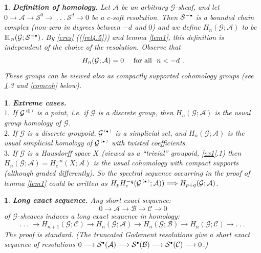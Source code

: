 \documentclass[a4paper]{article}
\newtheorem{num}[st]{}
\newcommand{\rmap}{\longrightarrow}
\newcommand{\G}{\ensuremath{\mathcal{G}}}
\newcommand{\A}{\ensuremath{\mathcal{A}}}
\newcommand{\es}{\ensuremath{\mathcal{S}}}
\newcommand{\B}{\ensuremath{\mathcal{B}}}
\newcommand{\C}{\ensuremath{\mathcal{C}}}
\newcommand{\ps}{{\raise 1pt\hbox{\tiny (}}}
\newcommand{\pd}{{\raise 1pt\hbox{\tiny )}}}
\newcommand{\nG}[1]{\ensuremath{\G^{\,\ps #1\,\pd}}}
\def\cdot{{\raise 0.5pt\hbox{$\scriptscriptstyle\bullet$}}}
\begin{document}
\begin{num}
\label{defhom}
\emph{
{\bf Definition of homology.} Let $\A$ be an arbitrary $\G$-sheaf, and let $0 \rmap \A \rmap \es^{0} \rmap \ .\ .\ .\ \es^{d} \rmap 0$ be a c-soft resolution. Then $\es^{-\cdot}$ is a bounded chain complex (non-zero in degrees between $-d$ and $0$) and we define $H_{n}(\G; \A)$ to be $\mathbb{H}_{\, n}(\G; \es^{-\cdot})$. By \ref{cres} ((\ref{rel4.5})) and lemma \ref{lem1}, this definition is independent of the choice of the resolution. Observe that
\[ H_{n}(\G; \A) = 0 \ \ \ \ {\rm for\  all}  \ \  n < -d \ .\]
These groups can be viewed also as compactly supported cohomology groups (see \ref{extreme}.3 and \ref{comcoh} below).
}
\end{num}
  

\begin{num}
\label{extreme}
\emph{
{\bf Extreme cases.} \\
\hspace*{.3in} $1.$ If $\nG{0}$ is a point, i.e. if $\G$ is a discrete group, then $H_{n}(\G; \A)$ is the usual group homology of $\G$.\\
\hspace*{.3in} $2.$ If $\G$ is a discrete groupoid, $\nG{\cdot}$ is a simplicial set, and $H_{n}(\G; \A)$ is the usual simplicial homology of $\nG{\cdot}$ with twisted coefficients.\\
\hspace*{.3in} $3.$ If $\G$ is a Hausdorff space $X$ (viewed as a ``trivial'' groupoid, \ref{ex1}.1) then $H_{n}(\G; \A) = H_{c}^{-n}(X; \A)$ is the usual cohomology with compact supports (although graded differently). So the spectral sequence occurring in the proof of lemma \ref{lem1} could be written as $H_{p}H_{c}^{-q}(\nG{\cdot}; \A)) \Longrightarrow H_{p+q}(\G; \A)$.
}
\end{num}



\begin{num}
\label{les}
\emph{
{\bf Long exact sequence.} Any short exact sequence: 
\[ 0 \rmap \A \rmap \B \rmap \C \rmap 0 \]
of $\G$-sheaves induces a long exact sequence in homology:
\[ .\ .\ .\ \rmap H_{n+1}(\G; \C) \rmap H_{n}(\G; \A) \rmap H_{n}(\G; \B) \rmap H_{n}(\G; \C) \rmap .\ .\ .\ \]
The proof is standard. (The truncated Godement resolutions give a short exact sequence of resolutions $0 \rmap \es^{\cdot}(\A) \rmap \es^{\cdot}(\B) \rmap \es^{\cdot}(\C) \rmap 0$.)
}
\end{num}
\end{document}
